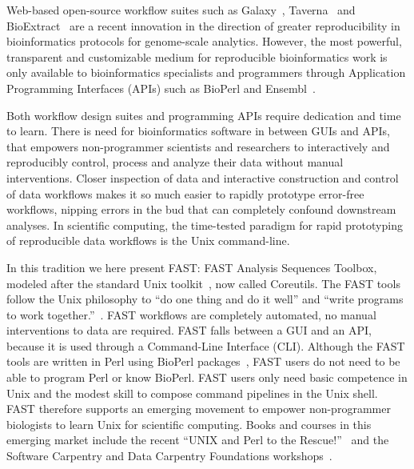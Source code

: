 \documentclass{frontiersSCNS} %
\begin{document}
Web-based open-source workflow suites such as Galaxy~\citep{galaxy14},
Taverna~\citep{CPE:CPE993} and BioExtract~\citep{Lushbough01072011}
are a recent innovation in the direction of greater reproducibility in
bioinformatics protocols for genome-scale analytics. However, the most
powerful, transparent and customizable medium for reproducible
bioinformatics work is only available to bioinformatics specialists
and programmers through Application Programming Interfaces (APIs) such
as BioPerl and Ensembl~\citep{Yates01012015}. 

Both workflow design suites and programming APIs require dedication
and time to learn.  There is need for bioinformatics software in
between GUIs and APIs, that empowers non-programmer scientists and
researchers to interactively and reproducibly control, process and
analyze their data without manual interventions. Closer inspection of
data and interactive construction and control of data workflows makes
it so much easier to rapidly prototype error-free workflows, nipping
errors in the bud that can completely confound downstream analyses.
In scientific computing, the time-tested paradigm for rapid
prototyping of reproducible data workflows is the Unix command-line.

In this tradition we here present FAST: FAST Analysis Sequences
Toolbox, modeled after the standard Unix toolkit~\citep{Peek2001}, now
called Coreutils.  The FAST tools follow the Unix philosophy to ``do
one thing and do it well'' and ``write programs to work
together.''~\citep{Stutz2000}. FAST workflows are completely
automated, no manual interventions to data are required.  FAST falls
between a GUI and an API, because it is used through a Command-Line
Interface (CLI).  Although the FAST tools are written in Perl using
BioPerl packages~\citep{Stajich2002}, FAST users do not need to be
able to program Perl or know BioPerl. FAST users only need basic
competence in Unix and the modest skill to compose command pipelines
in the Unix shell.  FAST therefore supports an emerging movement to
empower non-programmer biologists to learn Unix for scientific
computing. Books and courses in this emerging market include the
recent ``UNIX and Perl to the Rescue!''~\citep{bradnam2012unix} and
the Software Carpentry and Data Carpentry Foundations
workshops~\citep{wilson_software_2014}.
\end{document}
